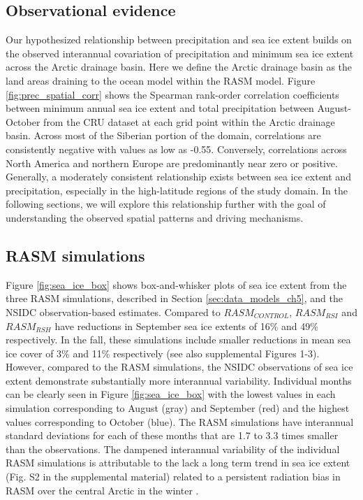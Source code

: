 \documentclass[draft,linenumbers]{agujournal}
\begin{document}
\subsection{Observational evidence}
Our hypothesized relationship between precipitation and sea ice extent builds on the observed interannual covariation of precipitation and minimum sea ice extent across the Arctic drainage basin.
Here we define the Arctic drainage basin as the land areas draining to the ocean model within the RASM model.
Figure \ref{fig:prec_spatial_corr} shows the Spearman rank-order correlation coefficients between minimum annual sea ice extent and total precipitation between August-October from the CRU dataset at each grid point within the Arctic drainage basin.
Across most of the Siberian portion of the domain, correlations are consistently negative with values as low as -0.55.
Conversely, correlations across North America and northern Europe are predominantly near zero or positive.
Generally, a moderately consistent relationship exists between sea ice extent and precipitation, especially in the high-latitude regions of the study domain.
In the following sections, we will explore this relationship further with the goal of understanding the observed spatial patterns and driving mechanisms.

\subsection{RASM simulations}
\label{sec:rasm_results}

Figure \ref{fig:sea_ice_box} shows box-and-whisker plots of sea ice extent from the three RASM simulations, described in Section \ref{sec:data_models_ch5}, and the NSIDC observation-based estimates.
Compared to $RASM_{CONTROL}$, $RASM_{RSI}$ and $RASM_{RSH}$ have reductions in September sea ice extents of 16\% and 49\% respectively.
In the fall, these simulations include smaller reductions in mean sea ice cover of 3\% and 11\% respectively (see also supplemental Figures 1-3).
However, compared to the RASM simulations, the NSIDC observations of sea ice extent demonstrate substantially more interannual variability.
Individual months can be clearly seen in Figure \ref{fig:sea_ice_box} with the lowest values in each simulation corresponding to August (gray) and September (red) and the highest values corresponding to October (blue).
The RASM simulations have interannual standard deviations for each of these months that are 1.7 to 3.3 times smaller than the observations.
The dampened interannual variability of the individual RASM simulations is attributable to the lack a long term trend in sea ice extent (Fig. S2 in the supplemental material) related to a persistent radiation bias in RASM over the central Arctic in the winter \citep{Cassano_2016}.
\end{document}
